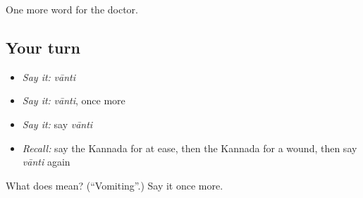 \begin{grammarlens}[title={What you've built}]
One more word for the doctor.
\end{grammarlens}

\subsection*{Your turn}
\begin{itemize}
\raggedright
  \item \emph{Say it:} \emph{vānti}
  \item \emph{Say it:} \emph{vānti}, once more
  \item \emph{Say it:} say \emph{vānti}
  \item \emph{Recall:} say the Kannada for at ease, then the Kannada for a wound, then say \emph{vānti} again
\end{itemize}

\begin{tcolorbox}[breakable,colback=teal!4,colframe=teal!35!black,title={Before you move on}]
What does  mean? (\textquotedblleft{}Vomiting\textquotedblright{}.) Say it once more.
\end{tcolorbox}
